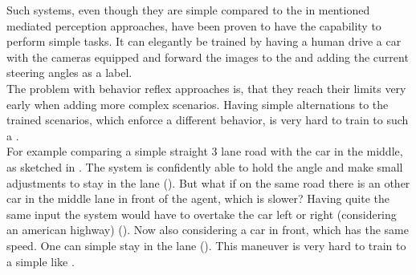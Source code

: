 Such systems, even though they are simple compared to the in  mentioned mediated perception approaches, have been proven to have the capability to perform simple tasks. It can elegantly be trained by having a human drive a car with the cameras equipped and forward the images to the \nn and adding the current steering angles as a label.\cite{chen2015deepdriving}\\

The problem with behavior reflex approaches is, that they reach their limits very early when adding more complex scenarios. Having simple alternations to the trained scenarios, which enforce a different behavior, is very hard to train to such a \nn.\\
For example comparing a simple straight 3 lane road with the car in the middle, as sketched in . The system is confidently able to hold the angle and make small adjustments to stay in the lane (). But what if on the same road there is an other car in the middle lane in front of the agent, which is slower? Having quite the same input the system would have to overtake the car left or right (considering an american highway) (). Now also considering a car in front, which has the same speed. One can simple stay in the lane (). This maneuver is very hard to train to a simple \nn like \alvinn.


